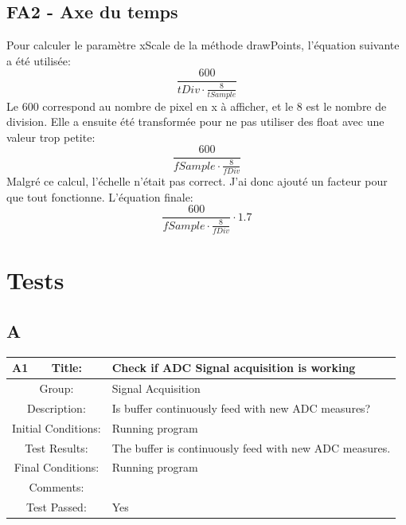 \documentclass[12pt]{article}
\begin{document}
	\subsection{FA2 - Axe du temps}
	Pour calculer le paramètre xScale de la méthode drawPoints, l'équation suivante a été utilisée:
	\begin{equation}
	\frac{600}{tDiv\cdot\frac{8}{tSample}}
	\end{equation}
	Le 600 correspond au nombre de pixel en x à afficher, et le 8 est le nombre de division.
	Elle a ensuite été transformée pour ne pas utiliser des float avec une valeur trop petite:
	\begin{equation}
		\frac{600}{fSample\cdot\frac{8}{fDiv}}
	\end{equation}
	Malgré ce calcul, l'échelle n'était pas correct. J'ai donc ajouté un facteur pour que tout fonctionne. L'équation finale:
	\begin{equation}
	\frac{600}{fSample\cdot\frac{8}{fDiv}}\cdot 1.7
	\end{equation}
	\section{Tests}
	\subsection{A}
		\begin{table}[H]
			\begin{center}
				\begin{tabular}{| m{2cm}|m{2cm}|m{12cm}|}
					\hline 
					\bf A1&\bf Title:&\bf Check if ADC Signal acquisition is working\\ 
					\hline 
					\multicolumn{2}{|c|}{Group:}&Signal Acquisition\\ 
					\hline 
					\multicolumn{2}{|c|}{Description:}&Is buffer continuously feed with new ADC measures?
					\\ 
					\hline 
					\multicolumn{2}{|c|}{Initial Conditions:}&Running program\\ 
					\hline 
					\multicolumn{2}{|c|}{Test Results:}&The buffer is continuously feed with new ADC measures.\\ 
					\hline 
					\multicolumn{2}{|c|}{Final Conditions:}&Running program\\ 
					\hline 
					\multicolumn{2}{|c|}{Comments:}&\\ 
					\hline 
					\multicolumn{2}{|c|}{Test Passed:}&Yes\\ 
					\hline 
				\end{tabular} 
			\end{center}
		\end{table}
	
\end{document}
